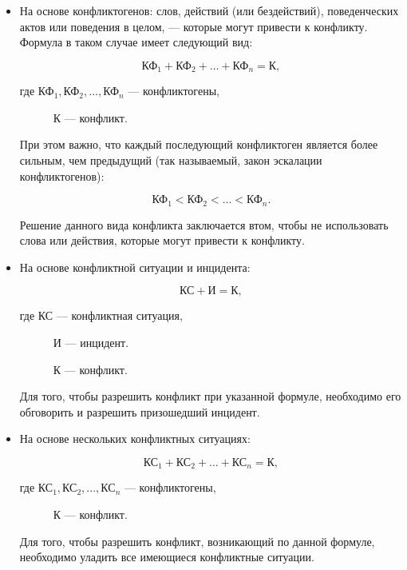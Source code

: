 \begin{itemize}
    \item На основе конфликтогенов: слов, действий (или бездействий),
        поведенческих актов или поведения в целом, --- которые могут привести
        к конфликту. Формула в таком случае имеет следующий вид:
        
        $$ \text{КФ}_1 + \text{КФ}_2 + ... + \text{КФ}_n = \text{К}, $$

      где $\text{КФ}_1, \text{КФ}_2, ..., \text{КФ}_n$ --- конфликтогены,
      
      ~~~~~~$\text{К}$ --- конфликт.

      При этом важно, что каждый последующий конфликтоген является более
      сильным, чем предыдущий (так называемый, закон эскалации
      конфликтогенов):

      $$\text{КФ}_1 < \text{КФ}_2 < ... < \text{КФ}_n.$$

      Решение данного вида конфликта заключается втом, чтобы не
      использовать слова или действия, которые могут привести к конфликту.
    \item На основе конфликтной ситуации и инцидента:

      $$\text{КС} + \text{И} = \text{К},$$

     где $\text{КС}$ --- конфликтная ситуация,

       ~~~~~~$\text{И}$ --- инцидент.

       ~~~~~~$\text{К}$ --- конфликт.

    Для того, чтобы разрешить конфликт при указанной формуле, необходимо
    его обговорить и разрешить призошедший инцидент.
    
    \item На основе нескольких конфликтных ситуациях:

        $$ \text{КС}_1 + \text{КС}_2 + ... + \text{КС}_n = \text{К}, $$

      где $\text{КС}_1, \text{КС}_2, ..., \text{КС}_n$ --- конфликтогены,
      
      ~~~~~~$\text{К}$ --- конфликт.

      Для того, чтобы разрешить конфликт, возникающий по данной формуле,
      необходимо уладить все имеющиеся конфликтные ситуации.
\end{itemize}


